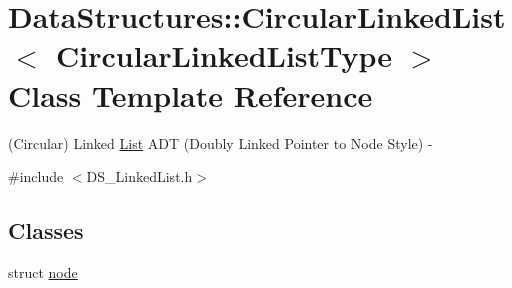\hypertarget{class_data_structures_1_1_circular_linked_list}{\section{Data\-Structures\-:\-:Circular\-Linked\-List$<$ Circular\-Linked\-List\-Type $>$ Class Template Reference}
\label{class_data_structures_1_1_circular_linked_list}
}


(Circular) Linked \hyperlink{class_data_structures_1_1_list}{List} A\-D\-T (Doubly Linked Pointer to Node Style) -\/  




{\ttfamily \#include $<$D\-S\-\_\-\-Linked\-List.\-h$>$}

\subsection*{Classes}
\begin{DoxyCompactItemize}
\item 
struct \hyperlink{struct_data_structures_1_1_circular_linked_list_1_1node}{node}
\end{DoxyCompactItemize}
